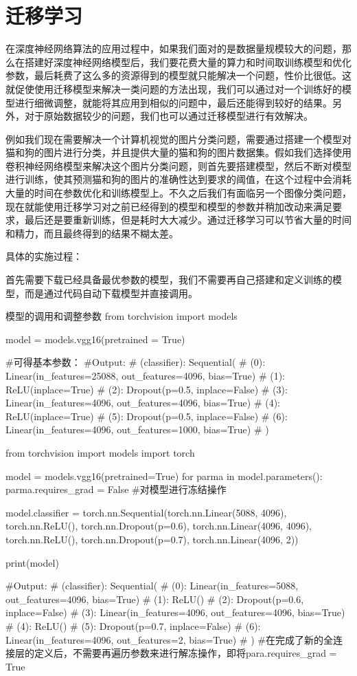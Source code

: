 \documentclass[openbib]{article}
\begin{document}
\section{迁移学习}
在深度神经网络算法的应用过程中，如果我们面对的是数据量规模较大的问题，那么在搭建好深度神经网络模型后，我们要花费大量的算力和时间取训练模型和优化参数，最后耗费了这么多的资源得到的模型就只能解决一个问题，性价比很低。这就促使使用迁移模型来解决一类问题的方法出现，我们可以通过对一个训练好的模型进行细微调整，就能将其应用到相似的问题中，最后还能得到较好的结果。另外，对于原始数据较少的问题，我们也可以通过迁移模型进行有效解决。

例如我们现在需要解决一个计算机视觉的图片分类问题，需要通过搭建一个模型对猫和狗的图片进行分类，并且提供大量的猫和狗的图片数据集。假如我们选择使用卷积神经网络模型来解决这个图片分类问题，则首先要搭建模型，然后不断对模型进行训练，使其预测猫和狗的图片的准确性达到要求的阈值，在这个过程中会消耗大量的时间在参数优化和训练模型上。不久之后我们有面临另一个图像分类问题，现在就能使用迁移学习对之前已经得到的模型和模型的参数并稍加改动来满足要求，最后还是要重新训练，但是耗时大大减少。通过迁移学习可以节省大量的时间和精力，而且最终得到的结果不糊太差。

具体的实施过程：

首先需要下载已经具备最优参数的模型，我们不需要再自己搭建和定义训练的模型，而是通过代码自动下载模型并直接调用。
\begin{Python}{模型的调用和调整参数}
from torchvision import models

model = models.vgg16(pretrained = True)

#可得基本参数：
#Output:
#	    (classifier): Sequential(
#					(0): Linear(in_features=25088, out_features=4096, bias=True)
#					(1): ReLU(inplace=True)
#					(2): Dropout(p=0.5, inplace=False)
#					(3): Linear(in_features=4096, out_features=4096, bias=True)
#					(4): ReLU(inplace=True)
#					(5): Dropout(p=0.5, inplace=False)
#					(6): Linear(in_features=4096, out_features=1000, bias=True)
#					)

from torchvision import models
import torch

model = models.vgg16(pretrained=True)
for parma in model.parameters():
	parma.requires_grad = False			#对模型进行冻结操作
	
model.classifier = torch.nn.Sequential(torch.nn.Linear(5088, 4096),
										torch.nn.ReLU(),
										torch.nn.Dropout(p=0.6),
										torch.nn.Linear(4096, 4096),
										torch.nn.ReLU(),
										torch.nn.Dropout(p=0.7),
										torch.nn.Linear(4096, 2))

print(model)

#Output:
#		  (classifier): Sequential(
#						(0): Linear(in_features=5088, out_features=4096, bias=True)
#						(1): ReLU()
#						(2): Dropout(p=0.6, inplace=False)
#						(3): Linear(in_features=4096, out_features=4096, bias=True)
#						(4): ReLU()
#						(5): Dropout(p=0.7, inplace=False)
#						(6): Linear(in_features=4096, out_features=2, bias=True)
#						)
#在完成了新的全连接层的定义后，不需要再遍历参数来进行解冻操作，即将para.requires_grad = True
\end{Python}
\end{document}
